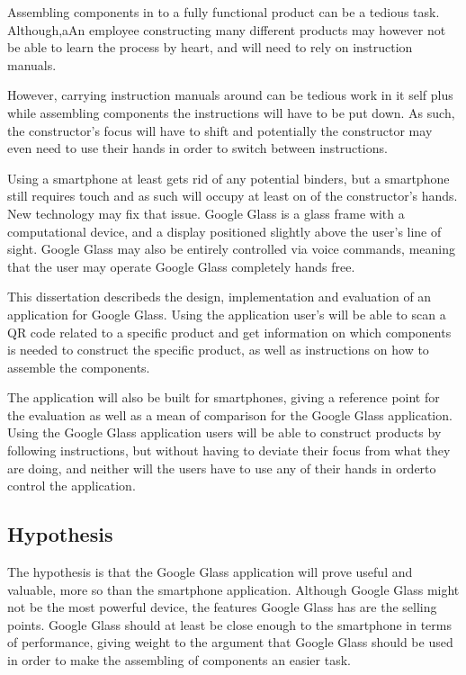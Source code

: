 


Assembling components in to a fully functional product can be a tedious task. Although,aAn employee constructing many different products may however not be able to learn the process by heart, and will need to rely on instruction manuals.

However, carrying instruction manuals around can be tedious work in it self plus while assembling components the instructions will have to be put down. As such, the constructor's focus will have to shift and potentially the constructor may even need to use their hands in order to switch between instructions. 

Using a smartphone at least gets rid of any potential binders, but a smartphone still requires touch and as such will occupy at least on of the constructor's hands. New technology may fix that issue. Google Glass is a glass frame with a computational device, and a display positioned slightly above the user's line of sight. Google Glass may also be entirely controlled via voice commands, meaning that the user may operate Google Glass completely hands free.

This dissertation describeds the design, implementation and evaluation of an application for Google Glass. Using the application user's will be able to scan a QR code related to a specific product and get information on which components is needed to construct the specific product, as well as instructions on how to assemble the components.

The application will also be built for smartphones, giving a reference point for the evaluation as well as a mean of comparison for the Google Glass application. Using the Google Glass application users will be able to construct products by following instructions, but without having to deviate their focus from what they are doing, and neither will the users have to use any of their hands in orderto control the application.

\subsection{Hypothesis}
The hypothesis is that the Google Glass application will prove useful and valuable, more so than the smartphone application. Although Google Glass might not be the most powerful device, the features Google Glass has are the selling points. Google Glass should at least be close enough to the smartphone in terms of performance, giving weight to the argument that Google Glass should be used in order to make the assembling of components an easier task.

